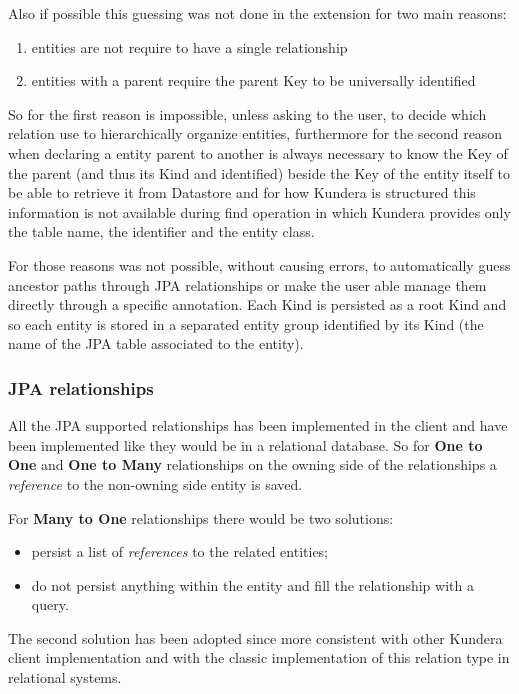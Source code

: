 \noindent Also if possible this guessing was not done in the extension for two main reasons:
\begin{enumerate}
\item entities are not require to have a single relationship
\item entities with a parent require the parent Key to be universally identified
\end{enumerate}
So for the first reason is impossible, unless asking to the user, to decide which relation use to hierarchically organize entities, furthermore for the second reason when declaring a entity parent to another is always necessary to know the Key of the parent (and thus its Kind and identified) beside the Key of the entity itself to be able to retrieve it from Datastore and for how Kundera is structured this information is not available during find operation in which Kundera provides only the table name, the identifier and the entity class.

\newparagraph For those reasons was not possible, without causing errors, to automatically guess ancestor paths through JPA relationships or make the user able manage them directly through a specific annotation.
Each Kind is persisted as a root Kind and so each entity is stored in a separated entity group identified by its Kind (the name of the JPA table associated to the entity).

\subsubsection{JPA relationships}
All the JPA supported relationships has been implemented in the client and  have been implemented like they would be in a relational database.
So for \textbf{One to One} and \textbf{One to Many} relationships on the owning side of the relationships a \textit{reference} to the non-owning side entity is saved.

\noindent For \textbf{Many to One} relationships there would be two solutions:
\begin{itemize}
\item persist a list of \textit{references} to the related entities;
\item do not persist anything within the entity and fill the relationship with a query.
\end{itemize}
The second solution has been adopted since more consistent with other Kundera client implementation and with the classic implementation of this relation type in relational systems.

